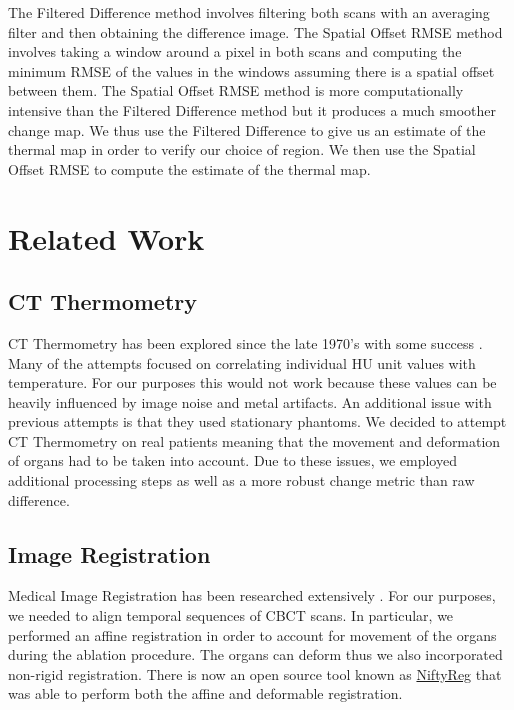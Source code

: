 \documentclass[]{spie}  %
\begin{document}
The Filtered Difference method involves filtering both scans with an averaging filter and then obtaining the difference image. The Spatial Offset RMSE method involves taking a window around a pixel in both scans and computing the minimum RMSE of the values in the windows assuming there is a spatial offset between them. The Spatial Offset RMSE method is more computationally intensive than the Filtered Difference method but it produces a much smoother change map. We thus use the Filtered Difference to give us an estimate of the thermal map in order to verify our choice of region. We then use the Spatial Offset RMSE to compute the estimate of the thermal map. 

\section{Related Work}

\subsection{CT Thermometry}

CT Thermometry has been explored since the late 1970's with some success \cite{Fani14}. Many of the attempts focused on correlating individual HU unit values with temperature. For our purposes this would not work because these values can be heavily influenced by image noise and metal artifacts. An additional issue with previous attempts is that they used stationary phantoms. We decided to attempt CT Thermometry on real patients meaning that the movement and deformation of organs had to be taken into account. Due to these issues, we employed additional processing steps as well as a more robust change metric than raw difference.

\subsection{Image Registration}

Medical Image Registration has been researched extensively \cite{Oliveira14, Hill01}. For our purposes, we needed to align temporal sequences of CBCT scans. In particular, we performed an affine registration in order to account for movement of the organs during the ablation procedure. The organs can deform thus we also incorporated non-rigid registration. There is now an open source tool known as \href{http://cmictig.cs.ucl.ac.uk/wiki/index.php/NiftyReg}{NiftyReg} \cite{Ourselin01,Modat10} that was able to perform both the affine \cite{Ourselin01} and deformable \cite{Modat10} registration.   
\end{document}

